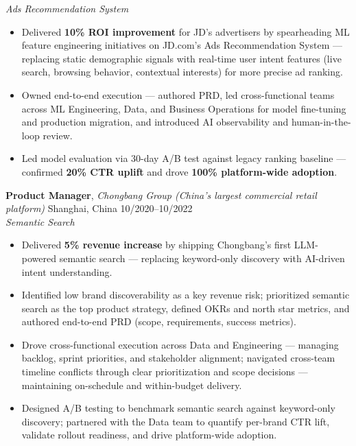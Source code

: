 \documentclass[10pt, letterpaper]{article}
\begin{document}
\textit{Ads Recommendation System}
\begin{itemize}
    \item Delivered \textbf{10\% ROI improvement} for JD's advertisers by spearheading ML feature engineering initiatives on JD.com's Ads Recommendation System --- replacing static demographic signals with real-time user intent features (live search, browsing behavior, contextual interests) for more precise ad ranking.
    \item Owned end-to-end execution --- authored PRD, led cross-functional teams across ML Engineering, Data, and Business Operations for model fine-tuning and production migration, and introduced AI observability and human-in-the-loop review.
    \item Led model evaluation via 30-day A/B test against legacy ranking baseline --- confirmed \textbf{20\% CTR uplift} and drove \textbf{100\% platform-wide adoption}.
\end{itemize}

\smallskip

\textbf{Product Manager}, \textit{Chongbang Group (China's largest commercial retail platform)} \hfill Shanghai, China \textbar{} 10/2020--10/2022\\
\textit{Semantic Search}
\begin{itemize}
    \item Delivered \textbf{5\% revenue increase} by shipping Chongbang's first LLM-powered semantic search --- replacing keyword-only discovery with AI-driven intent understanding.
    \item Identified low brand discoverability as a key revenue risk; prioritized semantic search as the top product strategy, defined OKRs and north star metrics, and authored end-to-end PRD (scope, requirements, success metrics).
    \item Drove cross-functional execution across Data and Engineering --- managing backlog, sprint priorities, and stakeholder alignment; navigated cross-team timeline conflicts through clear prioritization and scope decisions --- maintaining on-schedule and within-budget delivery.
    \item Designed A/B testing to benchmark semantic search against keyword-only discovery; partnered with the Data team to quantify per-brand CTR lift, validate rollout readiness, and drive platform-wide adoption.
\end{itemize}
\end{document}
